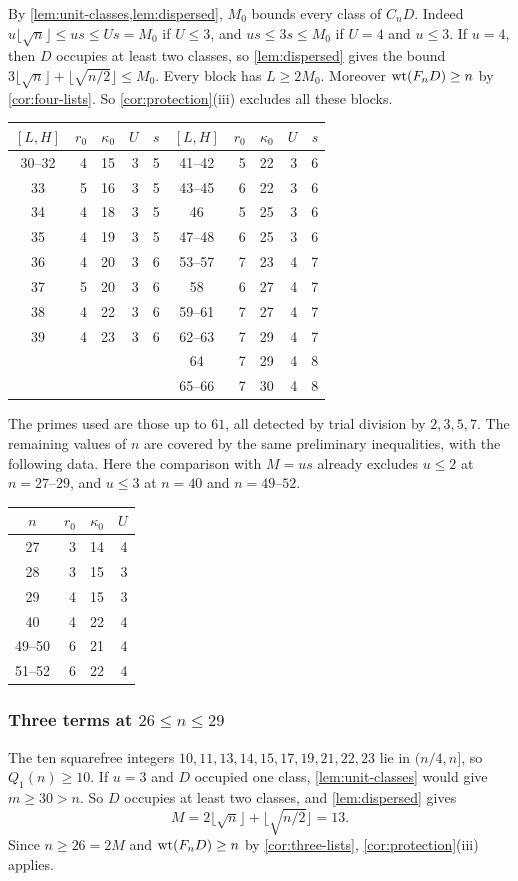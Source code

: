 By \cref{lem:unit-classes,lem:dispersed}, $M_0$ bounds every class of $C_nD$. Indeed $u\lfloor\sqrt n\rfloor\le us\le Us=M_0$ if $U\le3$, and $us\le3s\le M_0$ if $U=4$ and $u\le3$. If $u=4$, then $D$ occupies at least two classes, so \cref{lem:dispersed} gives the bound $3\lfloor\sqrt n\rfloor+\lfloor\sqrt{n/2}\rfloor\le M_0$. Every block has $L\ge2M_0$. Moreover $\operatorname{wt}(F_nD)\ge n$ by \cref{cor:four-lists}. So \cref{cor:protection}(iii) excludes all these blocks.

\smallskip
\begin{center}\small
\begin{tabular}{c|r|r|r|r@{\qquad}c|r|r|r|r}
$[L,H]$&$r_0$&$\kappa_0$&$U$&$s$&$[L,H]$&$r_0$&$\kappa_0$&$U$&$s$\\\hline
30--32&4&15&3&5&41--42&5&22&3&6\\
33&5&16&3&5&43--45&6&22&3&6\\
34&4&18&3&5&46&5&25&3&6\\
35&4&19&3&5&47--48&6&25&3&6\\
36&4&20&3&6&53--57&7&23&4&7\\
37&5&20&3&6&58&6&27&4&7\\
38&4&22&3&6&59--61&7&27&4&7\\
39&4&23&3&6&62--63&7&29&4&7\\
&&&&&64&7&29&4&8\\
&&&&&65--66&7&30&4&8
\end{tabular}
\end{center}
\smallskip

The primes used are those up to $61$, all detected by trial division by $2,3,5,7$. The remaining values of $n$ are covered by the same preliminary inequalities, with the following data. Here the comparison with $M=us$ already excludes $u\le2$ at $n=27$--$29$, and $u\le3$ at $n=40$ and $n=49$--$52$.

\smallskip
\begin{center}\small
\begin{tabular}{c|r|r|r}
$n$&$r_0$&$\kappa_0$&$U$\\\hline
27&3&14&4\\
28&3&15&3\\
29&4&15&3\\
40&4&22&4\\
49--50&6&21&4\\
51--52&6&22&4
\end{tabular}
\end{center}
\smallskip

\subsubsection*{Three terms at \texorpdfstring{$26\le n\le29$}{26 <= n <= 29}}
The ten squarefree integers $10,11,13,14,15,17,19,21,22,23$ lie in $(n/4,n]$, so $Q_1(n)\ge10$. If $u=3$ and $D$ occupied one class, \cref{lem:unit-classes} would give $m\ge30>n$. So $D$ occupies at least two classes, and \cref{lem:dispersed} gives
\[
 M=2\lfloor\sqrt n\rfloor+\lfloor\sqrt{n/2}\rfloor=13 .
\]
Since $n\ge26=2M$ and $\operatorname{wt}(F_nD)\ge n$ by \cref{cor:three-lists}, \cref{cor:protection}(iii) applies.

